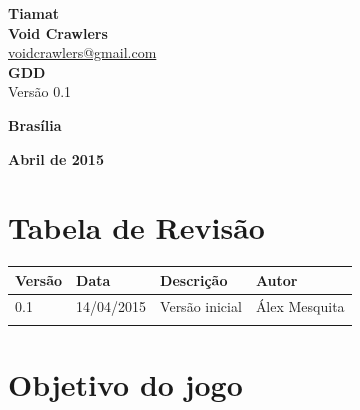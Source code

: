 \documentclass[11pt]{article} %
\begin{document}
\begin{titlepage}
 \vfill
  \begin{center}
   {\large \textbf{Tiamat}} \\
   {\large \textbf{Void Crawlers}}\\
   {\large \url{voidcrawlers@gmail.com}}\\[6cm]


   {\Large \textbf{GDD}}\\
   {\Large Versão 0.1}\\[6cm]

   \hspace{.45\textwidth} %
  \vfill

\vspace{2cm}

\large \textbf{Brasília}

\large \textbf{Abril de 2015}
\end{center}
\end{titlepage}
\newpage

\tableofcontents

\newpage


\section{Tabela de Revisão}


\begin{table}[h]
\begin{tabular}{|l|l|p{60mm}|l|}

\hline
\textbf{Versão}  	& \textbf{Data} 	& \textbf{Descrição} 								& \textbf{Autor} 	\\ \hline
0.1               	& 14/04/2015        & Versão inicial              						& Álex Mesquita 	\\ \hline
			      	& 	 	          	&           										&  					\\ \hline
\end{tabular}
\end{table}

\newpage

\section{Objetivo do jogo}
\end{document}
